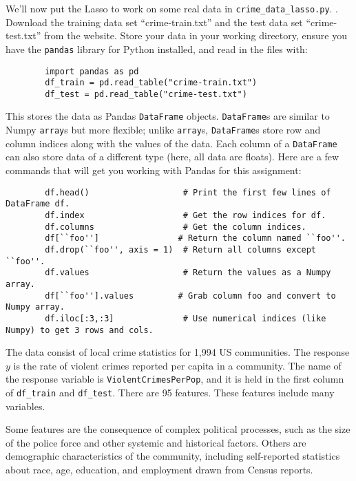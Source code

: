 \documentclass{article}
\begin{document}
\begin{aprob}
    \label{crime} 
    We'll now put the Lasso to work on some real data in \texttt{crime\_data\_lasso.py}. .  Download the training data set ``crime-train.txt'' and the test data set ``crime-test.txt'' from the website. Store your data in your working directory, ensure you have the \texttt{pandas} library for Python installed, and read in the files with:
    
    \begin{verbatim}
        import pandas as pd
        df_train = pd.read_table("crime-train.txt")
        df_test = pd.read_table("crime-test.txt")
    \end{verbatim}

    This stores the data as Pandas \texttt{DataFrame} objects. \texttt{DataFrame}s are similar to Numpy \texttt{array}s but more flexible; unlike \texttt{array}s, \texttt{DataFrame}s store row and column indices along with the values of the data. Each column of a \texttt{DataFrame} can also store data of a different type (here, all data are floats). 
    Here are a few commands that will get you working with Pandas for this assignment:

    \begin{verbatim}
        df.head()                   # Print the first few lines of DataFrame df.
        df.index                    # Get the row indices for df.
        df.columns                  # Get the column indices.
        df[``foo'']                # Return the column named ``foo''.
        df.drop(``foo'', axis = 1)  # Return all columns except ``foo''.
        df.values                   # Return the values as a Numpy array.
        df[``foo''].values         # Grab column foo and convert to Numpy array.
        df.iloc[:3,:3]              # Use numerical indices (like Numpy) to get 3 rows and cols.
    \end{verbatim}

    The data consist of local crime statistics for 1,994 US
    communities. The response $y$ is the rate of violent crimes reported per capita in a community. The name of the response variable is \texttt{ViolentCrimesPerPop}, and it is held in the first column of \texttt{df\_train} and \texttt{df\_test}. There are 95 features. These
    features include many variables.
    
    Some features are the consequence of complex political processes, such as the size of the police force and other systemic and historical factors. Others are demographic
    characteristics of the community, including self-reported statistics about race, age, education, and employment drawn from Census reports.\\
    

\end{aprob}
\end{document}
